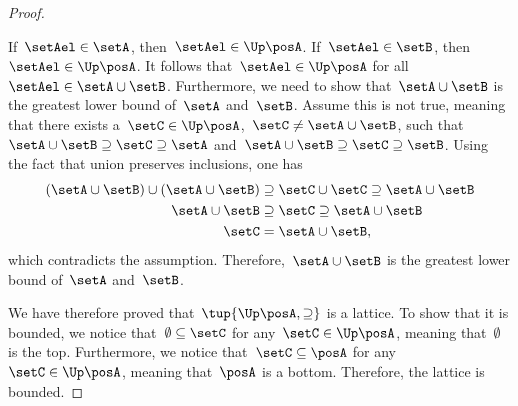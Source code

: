 \begin{definition}[Lattice]
\begin{proof}
\begin{compactitem}
    If~$\setAel\in \setA$, then~$\setAel\in \Up \posA$. If~$\setAel\in \setB$, then~$\setAel \in \Up \posA$.
    It follows that~$\setAel \in \Up \posA$ for all~$\setAel\in \setA\cup \setB$.
    Furthermore, we need to show that~$\setA\cup \setB$ is the greatest lower bound of~$\setA$ and~$\setB$.
    Assume this is not true, meaning that  there exists a~$\setC\in \Up \posA$,~$\setC\neq \setA\cup \setB$, such that~$\setA\cup \setB\supseteq \setC\supseteq \setA$ and~$\setA\cup \setB\supseteq \setC\supseteq \setB$.
    Using the fact that union preserves inclusions, one has
    \begin{equation}
      \begin{aligned}
      (\setA\cup \setB)
        \cup (\setA\cup \setB) &\supseteq \setC \cup \setC \supseteq \setA\cup \setB\\
        \setA\cup \setB &\supseteq \setC\supseteq \setA\cup \setB\\
        \setC&=\setA\cup \setB,
      \end{aligned}
    \end{equation}
    which contradicts the assumption. Therefore,~$\setA\cup \setB$ is the greatest lower bound of~$\setA$ and~$\setB$.
  \end{compactitem}
  We have therefore proved that~$\tup{\Up \posA,\supseteq}$ is a lattice.
  To show that it is bounded, we notice that~$\emptyset \subseteq \setC$ for any~$\setC\in \Up \posA$, meaning that~$\emptyset$ is the top.
  Furthermore, we notice that~$\setC\subseteq \posA$ for any~$\setC\in \Up \posA$, meaning that~$\posA$ is a bottom. Therefore, the lattice is bounded.
\end{proof}


\end{definition}
